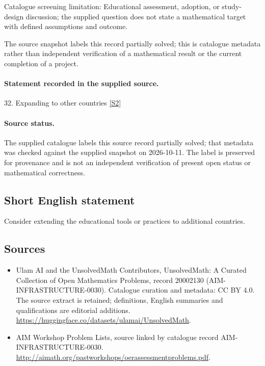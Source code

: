 \documentclass[11pt]{article}
\begin{document}
Catalogue screening limitation: Educational assessment, adoption, or study-design discussion; the supplied question does not state a mathematical target with defined assumptions and outcome.

The source snapshot labels this record partially solved; this is catalogue metadata rather than independent verification of a mathematical result or the current completion of a project.
\paragraph{Statement recorded in the supplied source.}
32. Expanding to other countries \href{http://aimath.org/pastworkshops/oerassessmentproblems.pdf}{[S2]}
\paragraph{Source status.}
The supplied catalogue labels this source record partially solved; that metadata was checked against the supplied snapshot on 2026-10-11. The label is preserved for provenance and is not an independent verification of present open status or mathematical correctness.
\subsection{Short English statement}
Consider extending the educational tools or practices to additional countries.
\subsection{Sources}
\begin{itemize}
\item[S1] Ulam AI and the UnsolvedMath Contributors, UnsolvedMath: A Curated Collection of Open Mathematics Problems, record 20002130 (AIM-INFRASTRUCTURE-0030). Catalogue curation and metadata: CC BY 4.0. The source extract is retained; definitions, English summaries and qualifications are editorial additions.
\url{https://huggingface.co/datasets/ulamai/UnsolvedMath}.
\item[S2] AIM Workshop Problem Lists, source linked by catalogue record AIM-INFRASTRUCTURE-0030.
\url{http://aimath.org/pastworkshops/oerassessmentproblems.pdf}.
\end{itemize}
\end{document}
